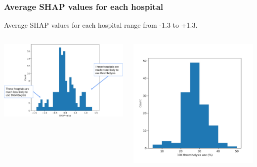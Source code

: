 \documentclass[xcolor={usenames,dvipsnames}]{beamer}
\begin{document}
\begin{frame}
\frametitle{Average SHAP values for each hospital}

Average SHAP values for each hospital range from -1.3 to +1.3.

\begin{columns}
    \begin{center} 
    \includegraphics[width=\textwidth]{./images/shap_average_per_hospital_annotated}
    \end{center}


    \vspace{0.5em}
    \begin{center} 
    \includegraphics[width=\textwidth, trim={0em 0em 0em 4em}, clip]{./images/predicted_thrombolysis_use}
    \end{center} 


\end{columns}
\end{frame}
\end{document}
